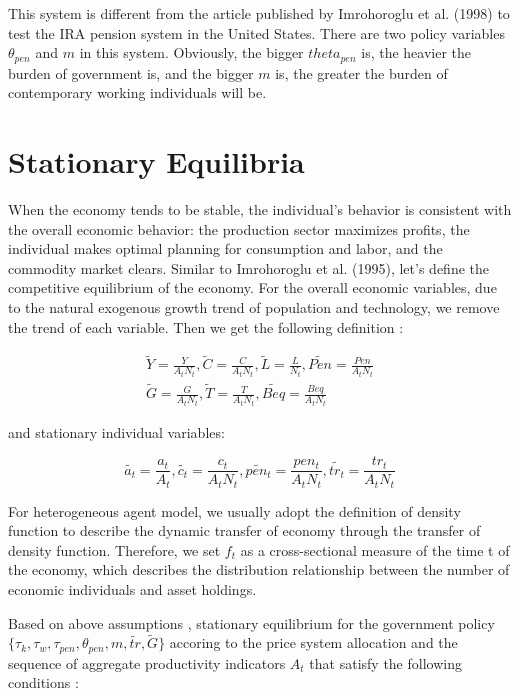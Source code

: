 \documentclass{article}
\begin{document}
        This system is different from the article published by Imrohoroglu et al. (1998) to test the IRA pension system in the United States. 
        There are two policy variables $\theta_{pen}$ and $m$ in this system. Obviously, the bigger $theta_{pen}$ is, 
        the heavier the burden of government is, and the bigger $m$ is, the greater the burden of contemporary working individuals will be.
\section{Stationary Equilibria}
    When the economy tends to be stable, the individual's behavior is consistent with the overall economic behavior: the production sector maximizes profits, 
    the individual makes optimal planning for consumption and labor, and the commodity market clears. Similar to Imrohoroglu et al. (1995), let's define the competitive equilibrium of the economy.
    For the overall economic variables, due to the natural exogenous growth trend of population and technology, we remove the trend of each variable.
    Then we get the following definition :

    \begin{equation}
        \begin{aligned}
        \tilde{Y}=\frac{Y}{A_tN_t} , \tilde{C}=\frac{C}{A_tN_t} , \tilde{L}=\frac{L}{N_t} , \tilde{Pen}=\frac{Pen}{A_tN_t} \\
          \tilde{G}=\frac{G}{A_tN_t} , \tilde{T}=\frac{T}{A_tN_t} , \tilde{Beq}=\frac{Beq}{A_tN_t}
        \end{aligned}      
    \end{equation}
        
    and stationary individual variables:

    \begin{equation}
        \tilde{a_t}=\frac{a_t}{A_t} , \tilde{c_t}=\frac{c_t}{A_tN_t} , \tilde{pen_t}=\frac{pen_t}{A_tN_t}
         , \tilde{tr_t}=\frac{tr_t}{A_tN_t}
    \end{equation}

    For heterogeneous agent model, we usually adopt the definition of density function to describe the dynamic transfer of economy through the transfer of density function.
    Therefore, we set $f_t$ as a cross-sectional measure of the time t of the economy, which describes the distribution relationship between the number of economic individuals and asset holdings.

    Based on above assumptions , stationary equilibrium for the government policy $\{\tau_k,\tau_w
    ,\tau_{pen},\theta_{pen},m,\tilde{tr},\tilde{G}\}$ accoring to the price system allocation and the
    sequence of aggregate productivity indicators ${A_t}$ that satisfy the following conditions : 
    
\end{document}
